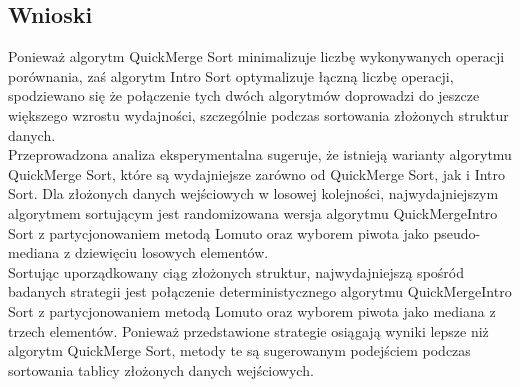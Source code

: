 \begin{figure}[]
	\centering
	
	\caption[]{}
	\label{fig:quick-merge-intro-sort-nondeterministic-pivot-random-sorted}
\end{figure}

\begin{figure}[]
	\centering
	
	\caption[]{}
	\label{fig:quick-merge-intro-sort-nondeterministic-pivot-density}
\end{figure}

\begin{figure}[]
	\centering
	
	\caption[]{}
	\label{fig:quick-merge-intro-sort-nondeterministic-pivot-density-sorted}
\end{figure}

\subsection{Wnioski}
Ponieważ algorytm QuickMerge Sort minimalizuje liczbę wykonywanych operacji porównania, zaś algorytm Intro Sort optymalizuje łączną liczbę operacji, spodziewano się że połączenie tych dwóch algorytmów doprowadzi do jeszcze większego wzrostu wydajności, szczególnie podczas sortowania złożonych struktur danych.\\

Przeprowadzona analiza eksperymentalna sugeruje, że istnieją warianty algorytmu QuickMerge Sort, które są wydajniejsze zarówno od QuickMerge Sort, jak i Intro Sort. Dla złożonych danych wejściowych w losowej kolejności, najwydajniejszym algorytmem sortującym jest randomizowana wersja algorytmu QuickMergeIntro Sort z partycjonowaniem metodą Lomuto oraz wyborem piwota jako pseudo-mediana z dziewięciu losowych elementów.\\

Sortując uporządkowany ciąg złożonych struktur, najwydajniejszą spośród badanych strategii jest połączenie deterministycznego algorytmu QuickMergeIntro Sort z partycjonowaniem metodą Lomuto oraz wyborem piwota jako mediana z trzech elementów. Ponieważ przedstawione strategie osiągają wyniki lepsze niż algorytm QuickMerge Sort, metody te są sugerowanym podejściem podczas sortowania tablicy złożonych danych wejściowych.\\ 
